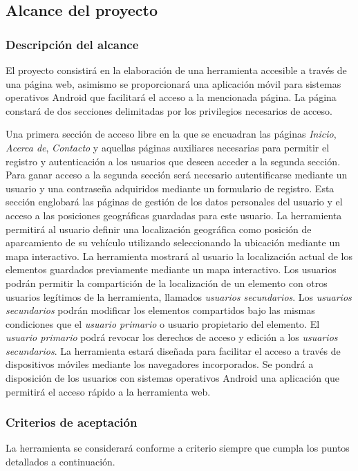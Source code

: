 	\subsection{Alcance del proyecto}
		\subsubsection{Descripción del alcance}
		\label{subsubsection:descripcion-alcance}
		El proyecto consistirá en la elaboración de una herramienta accesible a través de una página web, asimismo se proporcionará una aplicación móvil para sistemas operativos Android que facilitará el acceso a la mencionada página.
		La página constará de dos secciones delimitadas por los privilegios necesarios de acceso. 
		
		Una primera sección de acceso libre en la que se encuadran las páginas \textit{Inicio}, \textit{Acerca de}, \textit{Contacto} y aquellas páginas auxiliares necesarias para permitir el registro y autenticación a los usuarios que deseen acceder a la segunda sección.
		Para ganar acceso a la segunda sección será necesario autentificarse mediante un usuario y una contraseña adquiridos mediante un formulario de registro. Esta sección englobará las páginas de gestión de los datos personales del usuario y el acceso a las posiciones geográficas guardadas para este usuario.
		La herramienta permitirá al usuario definir una localización geográfica como posición de aparcamiento de su vehículo utilizando seleccionando la ubicación mediante un mapa interactivo.
		La herramienta mostrará al usuario la localización actual de los elementos guardados previamente mediante un mapa interactivo.
		Los usuarios podrán permitir la compartición de la localización de un elemento con otros usuarios legítimos de la herramienta, llamados \textit{usuarios secundarios}.
		Los \textit{usuarios secundarios} podrán modificar los elementos compartidos bajo las mismas condiciones que el \textit{usuario primario} o usuario propietario del elemento.
		El \textit{usuario primario} podrá revocar los derechos de acceso y edición a los \textit{usuarios secundarios}.
		La herramienta estará diseñada para facilitar el acceso a través de dispositivos móviles mediante los navegadores incorporados.
		Se pondrá a disposición de los usuarios con sistemas operativos Android una aplicación que permitirá el acceso rápido a la herramienta web.
	
		\subsubsection{Criterios de aceptación}
		\label{subsubsection:criterios-aceptacion}
		La herramienta se considerará conforme a criterio siempre que cumpla los puntos detallados a continuación.
		
